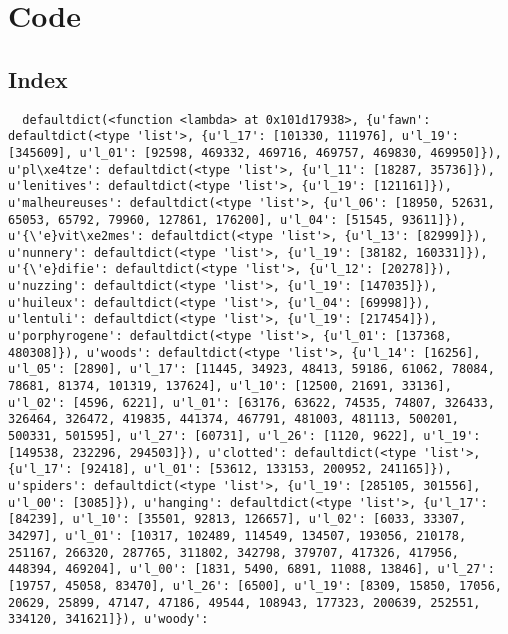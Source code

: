 
\chapter{Code}
\label{app:code}


\section{Index}

\begin{verbatim}
  defaultdict(<function <lambda> at 0x101d17938>, {u'fawn': defaultdict(<type 'list'>, {u'l_17': [101330, 111976], u'l_19': [345609], u'l_01': [92598, 469332, 469716, 469757, 469830, 469950]}), u'pl\xe4tze': defaultdict(<type 'list'>, {u'l_11': [18287, 35736]}), u'lenitives': defaultdict(<type 'list'>, {u'l_19': [121161]}), u'malheureuses': defaultdict(<type 'list'>, {u'l_06': [18950, 52631, 65053, 65792, 79960, 127861, 176200], u'l_04': [51545, 93611]}), u'{\'e}vit\xe2mes': defaultdict(<type 'list'>, {u'l_13': [82999]}), u'nunnery': defaultdict(<type 'list'>, {u'l_19': [38182, 160331]}), u'{\'e}difie': defaultdict(<type 'list'>, {u'l_12': [20278]}), u'nuzzing': defaultdict(<type 'list'>, {u'l_19': [147035]}), u'huileux': defaultdict(<type 'list'>, {u'l_04': [69998]}), u'lentuli': defaultdict(<type 'list'>, {u'l_19': [217454]}), u'porphyrogene': defaultdict(<type 'list'>, {u'l_01': [137368, 480308]}), u'woods': defaultdict(<type 'list'>, {u'l_14': [16256], u'l_05': [2890], u'l_17': [11445, 34923, 48413, 59186, 61062, 78084, 78681, 81374, 101319, 137624], u'l_10': [12500, 21691, 33136], u'l_02': [4596, 6221], u'l_01': [63176, 63622, 74535, 74807, 326433, 326464, 326472, 419835, 441374, 467791, 481003, 481113, 500201, 500331, 501595], u'l_27': [60731], u'l_26': [1120, 9622], u'l_19': [149538, 232296, 294503]}), u'clotted': defaultdict(<type 'list'>, {u'l_17': [92418], u'l_01': [53612, 133153, 200952, 241165]}), u'spiders': defaultdict(<type 'list'>, {u'l_19': [285105, 301556], u'l_00': [3085]}), u'hanging': defaultdict(<type 'list'>, {u'l_17': [84239], u'l_10': [35501, 92813, 126657], u'l_02': [6033, 33307, 34297], u'l_01': [10317, 102489, 114549, 134507, 193056, 210178, 251167, 266320, 287765, 311802, 342798, 379707, 417326, 417956, 448394, 469204], u'l_00': [1831, 5490, 6891, 11088, 13846], u'l_27': [19757, 45058, 83470], u'l_26': [6500], u'l_19': [8309, 15850, 17056, 20629, 25899, 47147, 47186, 49544, 108943, 177323, 200639, 252551, 334120, 341621]}), u'woody':
\end{verbatim}


